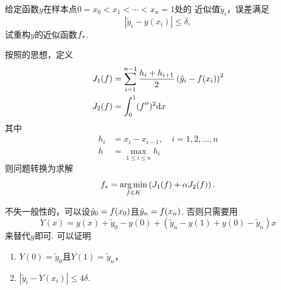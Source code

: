   \begin{prob}
    给定函数$y$在样本点$0=x_0 < x_1 < \cdots < x_n = 1$处的
    近似值$\tilde{y}_i$，误差满足
    \[
      |\tilde{y}_i - y(x_i)| \le \delta,
    \]
    试重构$y$的近似函数$\mathnormal{f}_*$.\par
    按照的思想，定义
    \[\begin{split}
      J_1(\mathnormal{f}) &= \sum_{i=1}^{n-1}\frac{h_i+h_{i+1}}{2}
      \left( \tilde{y}_i - \mathnormal{f}(x_i) \right)^2 \\
      J_2(\mathnormal{f}) &= \int_0^1 (\mathnormal{f}^{\prime\prime})^2\mathrm{d} x
    \end{split}\]
    其中
    \[\begin{split}
      h_i &= x_i - x_{i-1},\quad i = 1,2,\dots,n\\
      h &= \max_{1\le i\le n}h_i
    \end{split}\]
    则问题转换为求解
    \begin{equation}
      \label{equ: 正则化曲线拟合}
      \mathnormal{f}_* = \operatorname*{arg\,min}_{\mathnormal{f}\in K}\left( J_1(\mathnormal{f}) + \alpha J_2(\mathnormal{f}) \right).
    \end{equation}
  \end{prob}
  \remark
    不失一般性的，可以设$\tilde{y}_0 = \mathnormal{f}(x_0)$且$\tilde{y}_n=\mathnormal{f}(x_n)$.
    否则只需要用
    \[
      Y(x) = y(x)+\tilde{y}_0-y(0)+(\tilde{y}_n-y(1)+y(0)-\tilde{y}_n)x
    \]
    来替代$y$即可. 可以证明
    \begin{enumerate}
      \item $Y(0) = \tilde{y}_0$且$Y(1) = \tilde{y}_n$，
      \item $|\tilde{y}_i - Y(x_i)| \le 4\delta$.
    \end{enumerate}

